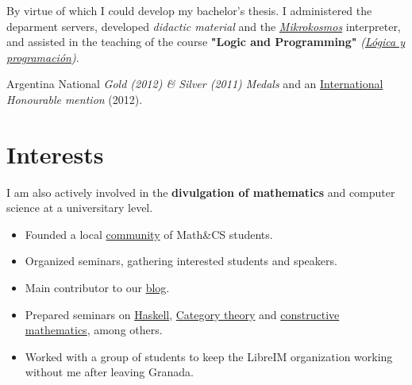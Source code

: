 \documentclass[nocolors]{friggeri-cv-a4}
\begin{document}
\begin{entrylist}

   {By virtue of which I could develop my
    bachelor's thesis. I administered the deparment servers, developed
    \textit{didactic material} and the \textit{\href{https://github.com/mroman42/mikrokosmos}{Mikrokosmos}}
    interpreter, and assisted in the teaching of the course
    \textbf{"Logic and Programming"} \textit{(\href{http://grados.ugr.es/informatica/pages/infoacademica/guias_docentes/201516/cuarto/ingenieriadelsoftware/complementos/logicayprogramacion/!}{Lógica y programación})}.  }

  
{Argentina}
{National \emph{Gold (2012) \& Silver (2011) Medals} and an
  \href{https://www.imo-official.org/team_r.aspx?code=ESP&year=2012}{International} \emph{Honourable mention} (2012).}


\end{entrylist}

\section{Interests}
I am also actively involved in the
\textbf{divulgation of mathematics} and computer science at a
universitary level.

\begin{entrylist}
  { \vspace{-2ex}\begin{itemize}
    \item Founded a local \href{http://libreim.github.io/}{community} of Math\&CS students.
      \item Organized seminars, gathering interested students and speakers.
      \item Main contributor to our \href{http://libreim.github.io/blog/}{blog}.
      \item Prepared seminars on
        \href{https://github.com/libreim/haskell}{Haskell},
        \href{https://github.com/libreim/introCategorias/blob/master/categorias.pdf}{Category
          theory} and \href{https://github.com/mroman42/libreim-constructiva/blob/master/constructiva.pdf}{constructive mathematics}, among others.
      \item Worked with a group of students to keep the LibreIM organization working without me after leaving Granada.
    \end{itemize}
  }
\end{entrylist}
\end{document}
